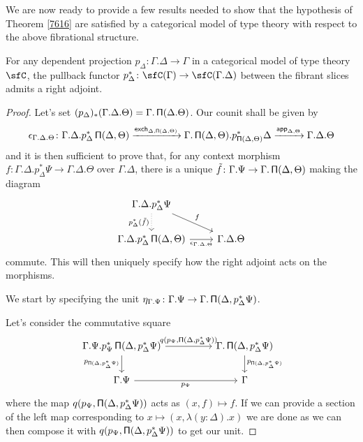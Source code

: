 We are now ready to provide a few results needed to show that the hypothesis of
Theorem \ref{7616} are satisfied by a categorical
model of type theory with respect to the above fibrational structure.

\begin{lem}\label{radj}
  For any dependent projection $p_\Delta\colon\Gamma.\Delta\rightarrow\Gamma$ in
  a categorical model of type theory $\sfC$, the pullback functor
  $p_\Delta^*\colon\sfC(\Gamma)\rightarrow\sfC(\Gamma.\Delta)$ between the fibrant
  slices admits a right adjoint.
\end{lem}
\begin{proof}

  Let's set $(p_\Delta)_*(\Gamma.\Delta.\Theta)=\Gamma.\operatorname{\mathsf{\Pi}}(\Delta.\Theta)$. Our
  counit shall be given by
  \[\epsilon_{\Gamma.\Delta.\Theta}\colon\Gamma.\Delta.p^*_\Delta\operatorname{\mathsf{\Pi}}(\Delta,\Theta)
  \xrightarrow{\operatorname{\mathsf{exch}}_{\Delta,\operatorname{\mathsf{\Pi}}(\Delta,\Theta)}}\Gamma.\operatorname{\mathsf{\Pi}}(\Delta,\Theta).p^*_{\operatorname{\mathsf{\Pi}}(\Delta,\Theta)}\Delta
  \xrightarrow{\operatorname{\mathsf{app}}_{\Delta,\Theta}}\Gamma.\Delta.\Theta\]
  and it is then sufficient to prove that, for any context morphism
  $f\colon\Gamma.\Delta.p^*_\Delta\Psi\rightarrow\Gamma.\Delta.\Theta$ over
  $\Gamma.\Delta$, there is
  a unique $\tilde{f}\colon\Gamma.\Psi\rightarrow\Gamma.\operatorname{\mathsf{\Pi}}(\Delta,\Theta)$
  making the diagram
  \[\begin{tikzcd}
    {\Gamma.\Delta.p^*_\Delta\Psi} \\
    {\Gamma.\Delta.p^*_\Delta\Pis(\Delta,\Theta)} & {\Gamma.\Delta.\Theta}
    \arrow["f", from=1-1, to=2-2]
    \arrow["{\epsilon_{\Gamma.\Delta.\Theta}}"', from=2-1, to=2-2]
    \arrow["{p^*_\Delta(\tilde{f})}"', dotted, from=1-1, to=2-1]
  \end{tikzcd}\]
  commute. This will then uniquely specify how the right adjoint acts on the
  morphisms.

  We start by specifying the unit
  $\eta_{\Gamma.\Psi}\colon\Gamma.\Psi\rightarrow\Gamma.\operatorname{\mathsf{\Pi}}(\Delta,p^*_{\Delta}\Psi)$.

  Let's consider the commutative square
  \[\begin{tikzcd}[column sep=huge]
    {\Gamma.\Psi.p^*_\Psi\Pis(\Delta,p^*_\Delta\Psi)} & {\Gamma.\Pis(\Delta,p^*_\Delta\Psi)} \\
    {\Gamma.\Psi} & \Gamma
    \arrow["{p_{\Pis(\Delta,p^*_\Delta\Psi)}}"', from=1-1, to=2-1]
    \arrow["{p_{\Psi}}"', from=2-1, to=2-2]
    \arrow["{p_{\Pis(\Delta,p^*_\Delta\Psi)}}", from=1-2, to=2-2]
    \arrow["{q(p_\Psi,\Pis(\Delta,p^*_\Delta\Psi))}", from=1-1, to=1-2]
  \end{tikzcd}\]
  where the map $q(p_\Psi,\operatorname{\mathsf{\Pi}}(\Delta,p^*_\Delta\Psi))$ acts as $(x,f)\mapsto
  f$. If we can provide a section of the left map
  corresponding to $x\mapsto(x,\lambda(y:\Delta).x)$ we are
  done as we can then compose
  it with $q(p_\Psi,\operatorname{\mathsf{\Pi}}(\Delta,p^*_\Delta\Psi))$ to get our unit.
  

\end{proof}
